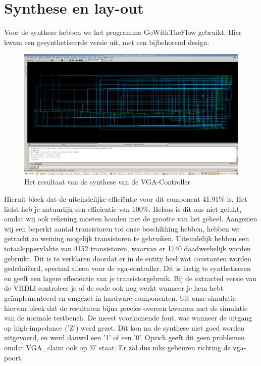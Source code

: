 \documentclass{scrartcl}  %
\begin{document}
\section{Synthese en lay-out}
Voor de synthese hebben we het programma GoWithTheFlow gebruikt. Hier kwam een gesynthetiseerde versie uit, met een bijbehorend design.
\begin{figure}[H]
\centering
		\includegraphics[width=1\textwidth]{resource/circuitvgafinal.png}
		
		\caption{Het resultaat van de synthese van de VGA-Controller}
		\label{fig:circuit}
\end{figure}
Hieruit bleek dat de uiteindelijke efficiëntie voor dit component 41.91\% is. Het liefst heb je natuurlijk een efficientie van 100\%. Helaas is dit ons niet gelukt, omdat wij ook rekening moeten houden met de grootte van het geheel. Aangezien wij een beperkt aantal transistoren tot onze beschikking hebben, hebben we getracht zo weining mogelijk transistoren te gebruiken. Uiteindelijk hebben een totaaloppervlakte van  4152 transistoren, waarvan er 1740 daadwerkelijk worden gebruikt. Dit is te verklaren doordat er in de entity heel wat constanten worden gedefiniëerd, speciaal alleen voor de vga-controller. Dit is lastig te synthetiseren en geeft een lagere effeciëntie van je transistorgebruik.
Bij de extracted versie van de VHDLl controleer je of de code ook nog werkt wanneer je hem hebt geïmplementeerd en omgezet in hardware componenten. Uit onze simulatie hiervan bleek dat de resultaten bijna precies overeen kwamen met de simulatie van de normale testbench. De meest voorkomende fout, was wanneer de uitgang op high-impedance ('Z') werd gezet. Dit kon na de synthese niet goed worden uitgevoerd, en werd danwel een '1' of een '0'. Opzich geeft dit geen problemen omdat VGA\_claim ook op '0' staat. Er zal dus niks gebeuren richting de vga-poort.
\end{document}
